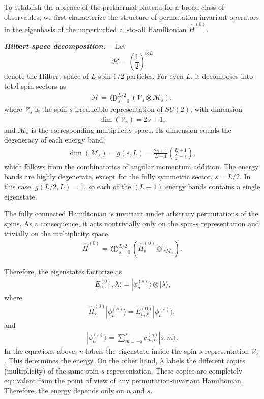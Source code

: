 \documentclass[aps,prl,amsfonts,floatfix,superscriptaddress,longbibliography,twocolumn,footinbib]{revtex4-2}
\begin{document}
To establish the absence of the prethermal plateau for a broad class of observables, we first characterize the structure of permutation-invariant operators in the eigenbasis of the unperturbed all-to-all Hamiltonian $\hat{H}^{(0)}$.

\textit{\textbf{Hilbert-space decomposition.}}---
Let
\begin{equation}
\mathcal H
=
\left(\frac{1}{2}\right)^{\otimes L}
\end{equation}
denote the Hilbert space of $L$ spin-$1/2$ particles. For even $L$, it decomposes into total-spin sectors as
\begin{align}
\mathcal H
=
\bigoplus_{s=0}^{L/2}
\left(
\mathcal V_s\otimes \mathcal M_s
\right),
\label{eq:HilbertDecomposition}
\end{align}
where $\mathcal V_s$ is the spin-$s$ irreducible representation of $SU(2)$, with dimension
\begin{align}
\dim(\mathcal V_s)=2s+1,
\end{align}
and $\mathcal M_s$ is the corresponding multiplicity space. Its dimension equals the degeneracy of each energy band,
\begin{align}
\dim(\mathcal M_s)
=g(s,L) =  \frac{2s + 1}{L + 1} \binom{L + 1}{\frac{L}{2} - s},
\end{align}
which follows from the combinatorics of angular momentum addition. The energy bands are highly degenerate, except for the fully symmetric sector,
$s=L/2$. In this case,
$g(L/2,L)=1$, so each of the $(L+1)$
energy bands contains a single eigenstate. 

The fully connected Hamiltonian is invariant under arbitrary permutations of the spins. As a consequence, it acts nontrivially only on the spin-$s$ representation and trivially on the multiplicity space,
\begin{align}
\hat H^{(0)}
=
\bigoplus_{s=0}^{L/2}
\left(
\hat H_s^{(0)}
\otimes
\hat{\mathbb I}_{\mathcal M_s}
\right).
\label{eq:H0Block}
\end{align}

Therefore, the eigenstates factorize as
\begin{align}
|E_{n,s}^{(0)},\lambda\rangle
=
|\phi_n^{(s)}\rangle
\otimes
|\lambda\rangle ,
\label{eq:FactorizedEigenstates}
\end{align}
where
\begin{align}
\hat H_s^{(0)}
|\phi_n^{(s)}\rangle
=
E_{n,s}^{(0)}
|\phi_n^{(s)}\rangle ,
\end{align}
and
\begin{align}
|\phi_n^{(s)}\rangle
=
\sum_{m=-s}^{s}
c_{m,n}^{(s)}
|s,m\rangle .
\end{align}
In the equations above, $n$ labels the eigenstate inside the spin-$s$ representation $\mathcal V_s$. This determines the energy. On the other hand, $\lambda$ labels the different copies (multiplicity) of the same spin-$s$ representation. These copies are completely equivalent from the point of view of any permutation-invariant Hamiltonian. Therefore, the energy depends only on $n$ and $s$.
\end{document}
